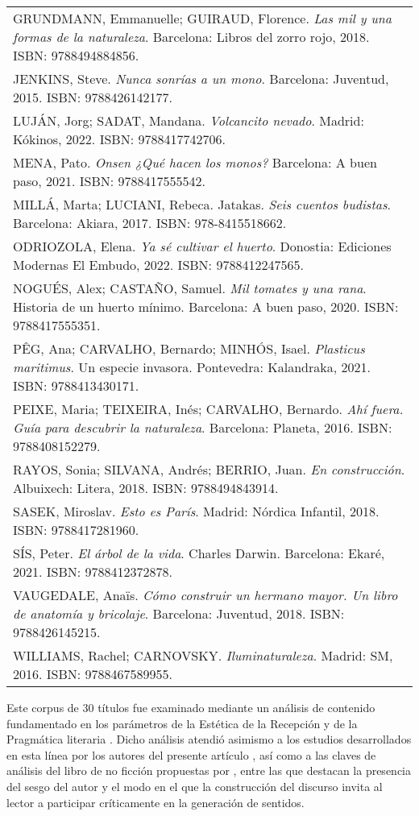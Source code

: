 \documentclass[spanish]{textolivre}
\begin{document}
\begin{table}[h!]
\begin{threeparttable}
\begin{tabular}{p{}}
GRUNDMANN, Emmanuelle; GUIRAUD, Florence. \textit{Las mil y una formas de la naturaleza}. Barcelona: Libros del zorro rojo, 2018. ISBN: 9788494884856. \\
JENKINS, Steve. \textit{Nunca sonrías a un mono}. Barcelona: Juventud, 2015. ISBN: 9788426142177. \\
LUJÁN, Jorg; SADAT, Mandana. \textit{Volcancito nevado}. Madrid: Kókinos, 2022. ISBN: 9788417742706. \\
MENA, Pato. \textit{Onsen ¿Qué hacen los monos?} Barcelona: A buen paso, 2021. ISBN: 9788417555542. \\
MILLÁ, Marta; LUCIANI, Rebeca. Jatakas. \textit{Seis cuentos budistas}. Barcelona: Akiara, 2017. ISBN: 978-8415518662. \\
ODRIOZOLA, Elena. \textit{Ya sé cultivar el huerto}. Donostia: Ediciones Modernas El Embudo, 2022. ISBN: 9788412247565. \\
NOGUÉS, Alex; CASTAÑO, Samuel.\textit{ Mil tomates y una rana}. Historia de un huerto mínimo. Barcelona: A buen paso, 2020. ISBN: 9788417555351. \\
PÊG, Ana; CARVALHO, Bernardo; MINHÓS, Isael.\textit{ Plasticus maritimus}. Un especie invasora. Pontevedra: Kalandraka, 2021. ISBN: 9788413430171. \\
PEIXE, Maria; TEIXEIRA, Inés; CARVALHO, Bernardo. \textit{Ahí fuera. Guía para descubrir la naturaleza}. Barcelona: Planeta, 2016. ISBN: 9788408152279. \\
RAYOS, Sonia; SILVANA, Andrés; BERRIO, Juan. \textit{En construcción}. Albuixech: Litera, 2018. ISBN: 9788494843914. \\
SASEK, Miroslav. \textit{Esto es París}. Madrid: Nórdica Infantil, 2018. ISBN: 9788417281960. \\
SÍS, Peter. \textit{El árbol de la vida}. Charles Darwin. Barcelona: Ekaré, 2021. ISBN: 9788412372878. \\
VAUGEDALE, Anaïs. \textit{Cómo construir un hermano mayor. Un libro de anatomía y bricolaje}. Barcelona: Juventud, 2018. ISBN: 9788426145215. \\
WILLIAMS, Rachel; CARNOVSKY. \textit{Iluminaturaleza}. Madrid: SM, 2016. ISBN: 9788467589955. \\
\bottomrule
\end{tabular}
\end{threeparttable}
\end{table}

Este corpus de 30 títulos fue examinado mediante un análisis de contenido fundamentado en los parámetros de la Estética de la Recepción y de la Pragmática literaria \cite{eco_role_1979,iser_acto_2022,jauss_pour_1987}. Dicho análisis atendió asimismo a los estudios desarrollados en esta línea por los autores del presente artículo \cite{tabernero__2022}, así como a las claves de análisis del libro de no ficción propuestas por \textcite{sanders_literature_2017}, entre las que destacan la presencia del sesgo del autor y el modo en el que la construcción del discurso invita al lector a participar críticamente en la generación de sentidos.
\end{document}
